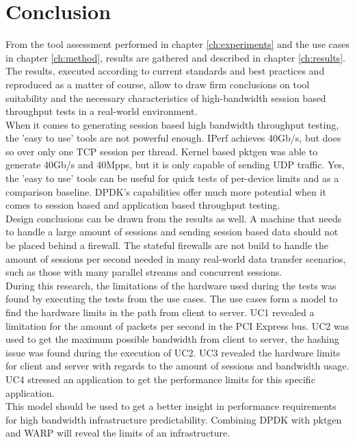 \chapter{Conclusion}\label{ch:conclusion}
From the tool assessment performed in chapter \ref{ch:experiments} and the use cases in chapter \ref{ch:method}, results are gathered and described in chapter \ref{ch:results}.
The results, executed according to current standards and best practices and reproduced as a matter of course, allow to draw firm conclusions on tool suitability and the necessary characteristics of high-bandwidth session based throughput tests in a real-world environment. \\
When it comes to generating session based high bandwidth throughput testing, the 'easy to use' tools are not powerful enough. IPerf achieves 40Gb/s, but does so over only one TCP session per thread. 
Kernel based pktgen was able to generate 40Gb/s and 40Mpps, but it is only capable of sending UDP traffic. 
Yes, the 'easy to use' tools can be useful for quick tests of per-device limits and as a comparison baseline.
DPDK's capabilities offer much more potential when it comes to session based and application based throughput testing. \\ 

Design conclusions can be drawn from the results as well. A machine that needs to handle a large amount of sessions and sending session based data should not be placed behind a firewall.
The stateful firewalls are not build to handle the amount of sessions per second needed in many real-world data transfer scenarios, such as those with many parallel streams and concurrent sessions. \\ 

During this research, the limitations of the hardware used during the tests was found by executing the tests from the use cases. 
The use cases form a model to find the hardware limits in the path from client to server. 
UC1 revealed  a limitation for the amount of packets per second in the PCI Express bus. 
UC2 was used to get the maximum possible bandwidth from client to server, the hashing issue was found during the execution of UC2.
UC3 revealed the hardware limits for client and server with regards to the amount of sessions and bandwidth usage.
UC4 stressed an application to get the performance limits for this specific application. \\ 

This model should be used to get a better insight in performance requirements for high bandwidth infrastructure predictability.
Combining DPDK with pktgen and WARP will reveal the limits of an infrastructure. \\

